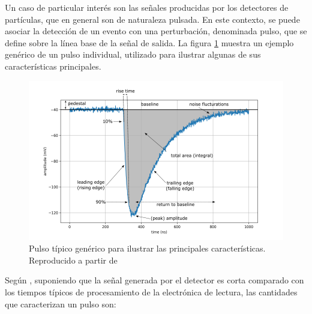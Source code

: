 \documentclass[]{book}
\begin{document}
\noindent Un caso de particular interés son las señales producidas por los detectores de partículas, que en general son de naturaleza pulsada. En este contexto, se puede asociar la detección de un evento con una perturbación, denominada pulso, que se define sobre la línea base de la señal de salida. La figura \ref{fig:pulse} muestra un ejemplo genérico de un pulso individual, utilizado para ilustrar algunas de sus características principales.\\

\begin{figure}[h]
    \centering
    \includegraphics[width=1.0\textwidth]{pulse_edited.png}
    \caption{Pulso típico genérico para ilustrar las principales características. Reproducido a partir de \cite{kolanoski2020particle}}
    \label{fig:pulse}

\end{figure}

\noindent Según \cite{knoll2010radiation}, suponiendo que la señal generada por el detector es corta comparado con los tiempos típicos de procesamiento de la electrónica de lectura, las cantidades que caracterizan un pulso son:
\end{document}
